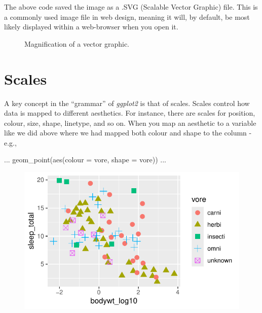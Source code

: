 \vspace{1em}

The above code saved the image as a .SVG (Scalable Vector Graphic) file. This is a commonly used image file in web design, meaning it will, by default, be most likely displayed within a web-browser when you open it.

\begin{figure}[H]
\centering

\caption{Magnification of a vector graphic.}
\end{figure}


\section{Scales}

A key concept in the ``grammar'' of \textit{ggplot2} is that of scales. Scales control how data is mapped to different aesthetics. For instance, there are scales for position, colour, size, shape, linetype, and so on. When you map an aesthetic to a variable like we did above where we had mapped both colour and shape to the  column - e.g.,

\begin{inR}
...
geom_point(aes(colour = vore, shape = vore))
...
\end{inR}

\vspace{2em}

\begin{figure}[H]
\includegraphics[scale = 0.75]{graphics/ch2Figs/ggEx_9.pdf}
\end{figure}

\vspace{1em}

